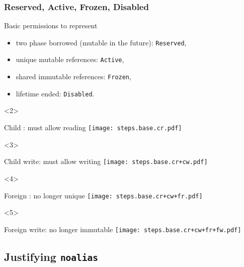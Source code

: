\begin{frame}[t]
    \frametitle{Reserved, Active, Frozen, Disabled}
    Basic permissions to represent
    \begin{itemize}
        \item two phase borrowed (mutable in the future): \texttt{Reserved},
        \item unique mutable references: \texttt{Active},
        \item shared immutable references: \texttt{Frozen},
        \item lifetime ended: \texttt{Disabled}.
    \end{itemize}

    \begin{onlyenv}<2>
        \begin{block}{Child : must allow reading}
        \texttt{[image: steps.base.cr.pdf]}
        \end{block}
    \end{onlyenv}

    \begin{onlyenv}<3>
        \begin{block}{Child write: must allow writing}
        \texttt{[image: steps.base.cr+cw.pdf]}
        \end{block}
    \end{onlyenv}

    \begin{onlyenv}<4>
        \begin{block}{Foreign : no longer unique}
        \texttt{[image: steps.base.cr+cw+fr.pdf]}
        \end{block}
    \end{onlyenv}

    \begin{onlyenv}<5>
        \begin{block}{Foreign write: no longer immutable}
        \texttt{[image: steps.base.cr+cw+fr+fw.pdf]}
        \end{block}
    \end{onlyenv}
\end{frame}

\subsection{Justifying \texttt{noalias}}

